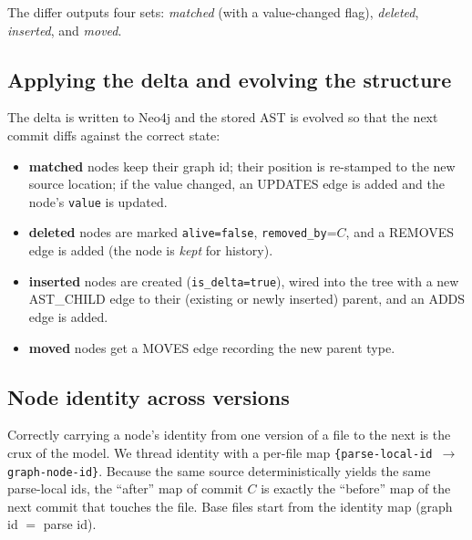 \documentclass[11pt,a4paper]{article}
\newcommand{\code}[1]{\texttt{#1}}
\newcommand{\edge}[1]{\textsc{#1}}
\begin{document}
	The differ outputs four sets: \emph{matched} (with a value-changed flag),
	\emph{deleted}, \emph{inserted}, and \emph{moved}.
	
	\subsection{Applying the delta and evolving the structure}
	The delta is written to Neo4j and the stored AST is evolved so that the next
	commit diffs against the correct state:
	
	\begin{itemize}[nosep]
		\item \textbf{matched} nodes keep their graph id; their position is re-stamped
		to the new source location; if the value changed, an \edge{UPDATES} edge
		is added and the node's \code{value} is updated.
		\item \textbf{deleted} nodes are marked \code{alive=false}, \code{removed\_by}=$C$,
		and a \edge{REMOVES} edge is added (the node is \emph{kept} for history).
		\item \textbf{inserted} nodes are created (\code{is\_delta=true}), wired into
		the tree with a new \edge{AST\_CHILD} edge to their (existing or newly
		inserted) parent, and an \edge{ADDS} edge is added.
		\item \textbf{moved} nodes get a \edge{MOVES} edge recording the new parent type.
	\end{itemize}
	
	\subsection{Node identity across versions}\label{sec:identity}
	Correctly carrying a node's identity from one version of a file to the next is
	the crux of the model. We thread identity with a per-file map
	\texttt{\{parse-local-id $\rightarrow$ graph-node-id\}}. Because the same source
	deterministically yields the same parse-local ids, the ``after'' map of commit
	$C$ is exactly the ``before'' map of the next commit that touches the file. Base
	files start from the identity map (graph id $=$ parse id).
	
\end{document}
